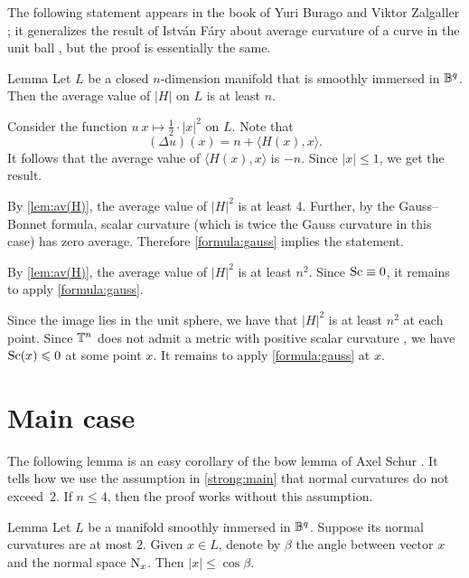\documentclass[a4paper,10pt]{article}
\begin{document}
The following statement appears in the book of Yuri Burago and Viktor Zalgaller \cite[Theorem~28.2.5]{burago-zalgaller};
it generalizes the result of István Fáry about average curvature of a curve in the unit ball \cite{fary,tabachnikov}, but the proof is essentially the same.

\begin{thm}{Lemma}\label{lem:av(H)}
Let $L$ be a closed $n$-dimension manifold that is smoothly immersed in $\mathbb{B}^q$.
Then the average value of $|H|$ on $L$ is at least $n$.
\end{thm}

Consider the function $u\:x\mapsto \tfrac12\cdot |x|^2$ on $L$.
Note that 
\[(\Delta u)(x)=n+ \langle H(x),x\rangle.\]
It follows that the average value of $\langle H(x),x\rangle$ is $-n$.
Since $|x|\le1$, we get the result.
\qeds

By \ref{lem:av(H)}, the average value of $|H|^2$ is at least 4.
Further, by the Gauss--Bonnet formula, scalar curvature (which is twice the Gauss curvature in this case) has zero average.
Therefore \ref{formula:gauss} implies the statement.
\qeds

By \ref{lem:av(H)},
the average value of $|H|^2$ is at least $n^2$.
Since $\mathrm{Sc}\equiv0$, it remains to apply \ref{formula:gauss}.
\qeds

Since the image lies in the unit sphere, we have that $|H|^2$ is at least $n^2$ at each point.
Since $\mathbb{T}^n$ does not admit a metric with positive scalar curvature \cite[Cor. A]{gromov-lawson}, we have $\mathrm{Sc}(x)\leqslant 0$ at some point $x$.
It remains to apply \ref{formula:gauss} at $x$.
\qeds

\section{Main case}

The following lemma is an easy corollary of the bow lemma of Axel Schur \cite{shur,petrunin-zamora}.
It tells how we use the assumption in \ref{strong:main} that normal curvatures do not exceed~$2$.
If $n\le4$, then the proof works without this assumption.

\begin{thm}{Lemma}\label{lem:trivial}
Let $L$ be a manifold smoothly immersed in $\mathbb{B}^q$.
Suppose its normal curvatures are at most $2$.
Given $x\in L$, denote by $\beta$ the angle between vector $x$ and the normal space $\mathrm{N}_x$.
Then $|x|\le \cos\beta$.
\end{thm}
\end{document}
